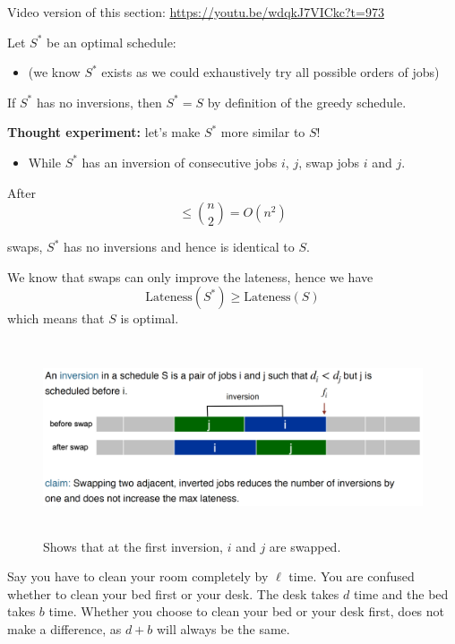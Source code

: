\begin{Tip}
    Video version of this section: \href{https://youtu.be/wdqkJ7VICkc?t=973}{https://youtu.be/wdqkJ7VICkc?t=973}
\end{Tip}

\newpage

\begin{Proof}
    Let $S^*$ be an optimal schedule:
    \begin{itemize}
        \item (we know $S^*$ exists as we could exhaustively try all possible orders of jobs)
    \end{itemize}
    \noindent
    If $S^*$ has no inversions, then $S^* = S$ by definition of the greedy schedule.
    
    \textbf{Thought experiment:} let’s make $S^*$ more similar to $S$!
    \begin{itemize}
        \item While $S^*$ has an inversion of consecutive jobs $i$, $j$, swap jobs $i$ and $j$.
    \end{itemize}
 
    After 
    \[
    \leq \binom{n}{2} = O(n^2)
    \]

    swaps, $S^*$ has no inversions and hence is identical to $S$.
    
    
    We know that swaps can only improve the lateness, hence we have
    \[
    \text{Lateness}(S^*) \geq \text{Lateness}(S)
    \]
    which means that $S$ is optimal.
    \end{Proof}
    \begin{figure}[h]
        \begin{center}
          \includegraphics[height=2.25in]{./Sections/sched/late/late_proof.png}
        \end{center}
         \caption{Shows that at the first inversion, $i$ and $j$ are swapped.}\label{fig:late_proof}
    \end{figure}
    \begin{Tip}
        Say you have to clean your room completely by $\ell$ time. You are 
        confused whether to clean your bed first or your desk. The desk takes $d$ time and the bed takes $b$ time.
        Whether you choose to clean your bed or your desk first, does not make a difference, as $d+b$ will always be the same.
    \end{Tip}
    
